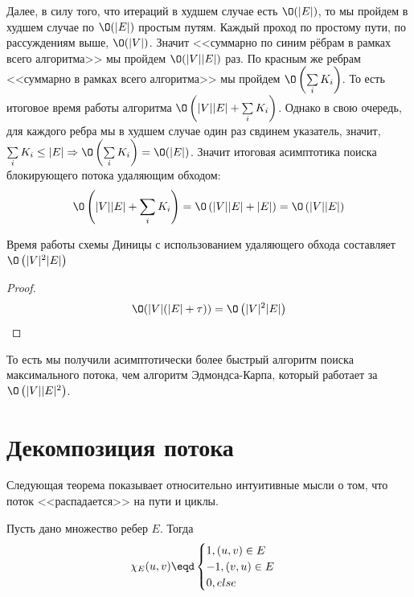 Далее, в силу того, что итераций в худшем случае есть $\O(|E|)$, то мы пройдем в худшем случае по $\O(|E|)$ простым путям. Каждый проход по простому пути, по рассуждениям выше, $\O(|V|)$. Значит <<суммарно по синим рёбрам в рамках всего алгоритма>> мы пройдем $\O(|V||E|)$ раз.
По красным же ребрам <<суммарно в рамках всего алгоритма>> мы пройдем $\O\left( \sum\limits_{i} K_i \right)$. То есть итоговое время работы алгоритма $\O\left( |V| |E| + \sum\limits_{i} K_i \right)$.
Однако в свою очередь, для каждого ребра мы в худшем случае один раз свдинем указатель, значит, $\sum\limits_{i} K_i \leq |E| \Rightarrow \O\left( \sum\limits_{i} K_i \right) = \O(|E|)$.
Значит итоговая асимптотика поиска блокирующего потока удаляющим обходом:
\begin{equation*}
    \O\left( |V| |E| + \sum\limits_{i} K_i \right) = \O\left( |V| |E| + |E| \right) = \O\left( |V| |E| \right)
\end{equation*}

\Cons Время работы схемы Диницы с использованием удаляющего обхода составляет $\O\left(|V|^2 |E|\right)$
\begin{proof}
    \begin{equation*}
        \O(|V|(|E| + \tau)) = \O\left(|V|^2|E|\right)
    \end{equation*}
\end{proof}

То есть мы получили асимптотически более быстрый алгоритм поиска максимального потока, чем алгоритм Эдмондса-Карпа, который работает за $\O\left( |V||E|^2 \right)$.

\section{Декомпозиция потока}

Следующая теорема показывает относительно интуитивные мысли о том, что поток <<распадается>> на пути и циклы.

\Def Пусть дано множество ребер $E$. Тогда
\begin{equation*}
    \chi_E (u, v) \eqd \begin{cases}
        1, (u, v) \in E \\
        -1, (v, u) \in E \\
        0, else
    \end{cases}
\end{equation*}

